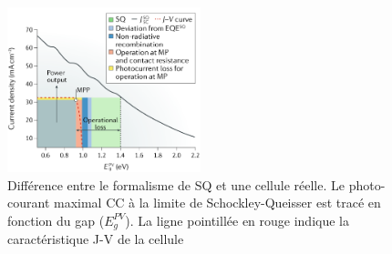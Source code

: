 \begin{figure}
  \begin{center}
    \includegraphics[width=0.5\textwidth]{resources/natsq.png}
    \caption{Différence entre le formalisme de SQ et une cellule réelle. Le photo-courant maximal CC à la limite de Schockley-Queisser est tracé en fonction du gap ($E_{g}^{PV}$). La ligne pointillée en rouge indique la caractéristique J-V de la cellule \cite{nayak2019}}
    \label{fig:natsq}
  \end{center}
\end{figure}
